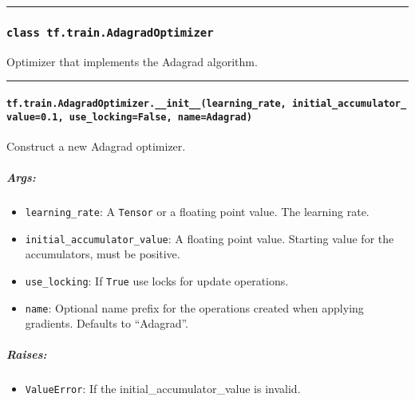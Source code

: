\begin{center}\rule{0.5\linewidth}{\linethickness}\end{center}

\subsubsection{\texorpdfstring{\texttt{class\ tf.train.AdagradOptimizer}
}{class tf.train.AdagradOptimizer }}\label{class-tf.train.adagradoptimizer}

Optimizer that implements the Adagrad algorithm.

\begin{center}\rule{0.5\linewidth}{\linethickness}\end{center}

\paragraph{\texorpdfstring{\texttt{tf.train.AdagradOptimizer.\_\_init\_\_(learning\_rate,\ initial\_accumulator\_value=0.1,\ use\_locking=False,\ name=\textquotesingle{}Adagrad\textquotesingle{})}
}{tf.train.AdagradOptimizer.\_\_init\_\_(learning\_rate, initial\_accumulator\_value=0.1, use\_locking=False, name='Adagrad') }}\label{tf.train.adagradoptimizer.ux5fux5finitux5fux5flearningux5frate-initialux5faccumulatorux5fvalue0.1-useux5flockingfalse-nameadagrad}

Construct a new Adagrad optimizer.

\subparagraph{Args: }\label{args-6}

\begin{itemize}
\tightlist
\item
  \texttt{learning\_rate}: A \texttt{Tensor} or a floating point value.
  The learning rate.
\item
  \texttt{initial\_accumulator\_value}: A floating point value. Starting
  value for the accumulators, must be positive.
\item
  \texttt{use\_locking}: If \texttt{True} use locks for update
  operations.
\item
  \texttt{name}: Optional name prefix for the operations created when
  applying gradients. Defaults to ``Adagrad''.
\end{itemize}

\subparagraph{Raises: }\label{raises-4}

\begin{itemize}
\tightlist
\item
  \texttt{ValueError}: If the initial\_accumulator\_value is invalid.
\end{itemize}

